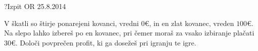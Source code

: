\begin{naloga}{?}{Izpit OR 25.8.2014}
\begin{vprasanje}
V škatli so štirje ponarejeni kovanci, vredni $0 €$,
in en zlat kovanec, vreden $100 €$.
Na slepo lahko izbereš po en kovanec,
pri čemer moraš za vsako izbiranje plačati $30 €$.
Določi povprečen profit, ki ga dosežeš pri igranju te igre.
\end{vprasanje}
\begin{odgovor}
\end{odgovor}
\end{naloga}
